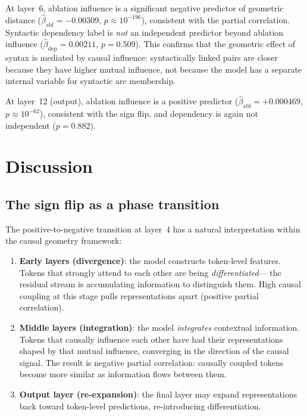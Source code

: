 \documentclass[11pt,a4paper]{article}
\begin{document}
At layer~6, ablation influence is a significant negative predictor of geometric
distance ($\hat{\beta}_{\mathrm{abl}} = -0.00309$, $p \approx 10^{-196}$),
consistent with the partial correlation.
Syntactic dependency label is \emph{not} an independent predictor beyond
ablation influence ($\hat{\beta}_{\mathrm{dep}} = 0.00211$, $p = 0.509$).
This confirms that the geometric effect of syntax is mediated by causal influence:
syntactically linked pairs are closer because they have higher mutual influence,
not because the model has a separate internal variable for syntactic arc membership.

At layer~12 (output), ablation influence is a positive predictor
($\hat{\beta}_{\mathrm{abl}} = +0.000469$, $p \approx 10^{-62}$), consistent
with the sign flip, and dependency is again not independent ($p = 0.882$).

\section{Discussion}

\subsection{The sign flip as a phase transition}

The positive-to-negative transition at layer~4 has a natural interpretation
within the causal geometry framework:
\begin{enumerate}
\item \textbf{Early layers (divergence)}: the model constructs token-level
  features. Tokens that strongly attend to each other are being \emph{differentiated}---
  the residual stream is accumulating information to distinguish them.
  High causal coupling at this stage pulls representations apart (positive partial correlation).

\item \textbf{Middle layers (integration)}: the model \emph{integrates} contextual
  information. Tokens that causally influence each other have had their representations
  shaped by that mutual influence, converging in the direction of the causal signal.
  The result is negative partial correlation: causally coupled tokens become
  more similar as information flows between them.

\item \textbf{Output layer (re-expansion)}: the final layer may expand representations
  back toward token-level predictions, re-introducing differentiation.
\end{enumerate}
\end{document}
